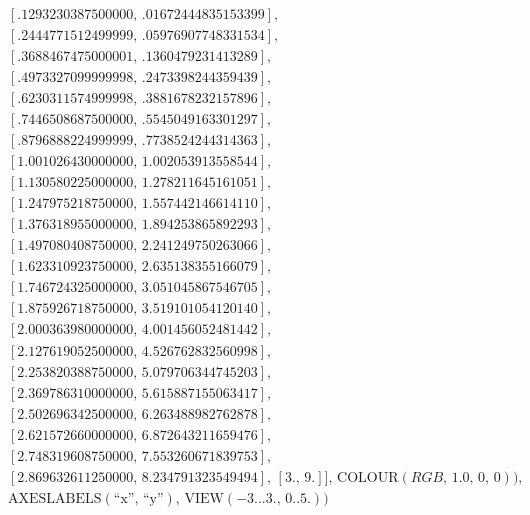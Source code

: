 \documentclass{article}
\begin{document}
\begin{maplegroup}
\begin{maplelatex}
\begin{eqnarray*}
 & & [.1293230387500000, \,.01672444835153399],  \\
 & & [.2444771512499999, \,.05976907748331534],  \\
 & & [.3688467475000001, \,.1360479231413289],  \\
 & & [.4973327099999998, \,.2473398244359439],  \\
 & & [.6230311574999998, \,.3881678232157896],  \\
 & & [.7446508687500000, \,.5545049163301297],  \\
 & & [.8796888224999999, \,.7738524244314363],  \\
 & & [1.001026430000000, \,1.002053913558544],  \\
 & & [1.130580225000000, \,1.278211645161051],  \\
 & & [1.247975218750000, \,1.557442146614110],  \\
 & & [1.376318955000000, \,1.894253865892293],  \\
 & & [1.497080408750000, \,2.241249750263066],  \\
 & & [1.623310923750000, \,2.635138355166079],  \\
 & & [1.746724325000000, \,3.051045867546705],  \\
 & & [1.875926718750000, \,3.519101054120140],  \\
 & & [2.000363980000000, \,4.001456052481442],  \\
 & & [2.127619052500000, \,4.526762832560998],  \\
 & & [2.253820388750000, \,5.079706344745203],  \\
 & & [2.369786310000000, \,5.615887155063417],  \\
 & & [2.502696342500000, \,6.263488982762878],  \\
 & & [2.621572660000000, \,6.872643211659476],  \\
 & & [2.748319608750000, \,7.553260671839753],  \\
 & & [2.869632611250000, \,8.234791323549494], \,[3., \,9.]], \,
\mathrm{COLOUR}(\mathit{RGB}, \,1.0, \,0, \,0)),  \\
 & & \mathrm{AXESLABELS}(\mbox{``x''}, \,\mbox{``y''}), \,
\mathrm{VIEW}(-3. .. 3., \,0 .. 5.))
\end{eqnarray*}
\end{maplelatex}

\end{maplegroup}
\begin{maplegroup}
\begin{mapleinput}
\end{mapleinput}

\mapleresult
\begin{center}
\end{center}

\end{maplegroup}
\begin{maplegroup}
\begin{mapleinput}
\end{mapleinput}

\end{maplegroup}
\end{document}
